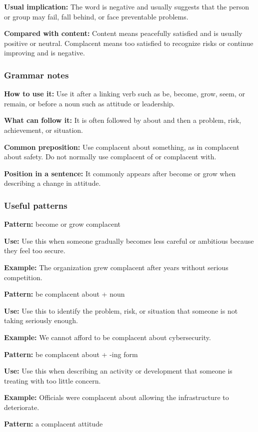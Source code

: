 \documentclass[11pt]{article}
\begin{document}
\textbf{Usual implication:} The word is negative and usually suggests that the person or group may fail, fall behind, or face preventable problems.

\textbf{Compared with content:} Content means peacefully satisfied and is usually positive or neutral. Complacent means too satisfied to recognize risks or continue improving and is negative.

\subsubsection{Grammar notes}
\textbf{How to use it:} Use it after a linking verb such as be, become, grow, seem, or remain, or before a noun such as attitude or leadership.

\textbf{What can follow it:} It is often followed by about and then a problem, risk, achievement, or situation.

\textbf{Common preposition:} Use complacent about something, as in complacent about safety. Do not normally use complacent of or complacent with.

\textbf{Position in a sentence:} It commonly appears after become or grow when describing a change in attitude.

\subsubsection{Useful patterns}
\textbf{Pattern:} become or grow complacent

\textbf{Use:} Use this when someone gradually becomes less careful or ambitious because they feel too secure.

\textbf{Example:} The organization grew complacent after years without serious competition.

\textbf{Pattern:} be complacent about + noun

\textbf{Use:} Use this to identify the problem, risk, or situation that someone is not taking seriously enough.

\textbf{Example:} We cannot afford to be complacent about cybersecurity.

\textbf{Pattern:} be complacent about + -ing form

\textbf{Use:} Use this when describing an activity or development that someone is treating with too little concern.

\textbf{Example:} Officials were complacent about allowing the infrastructure to deteriorate.

\textbf{Pattern:} a complacent attitude
\end{document}
